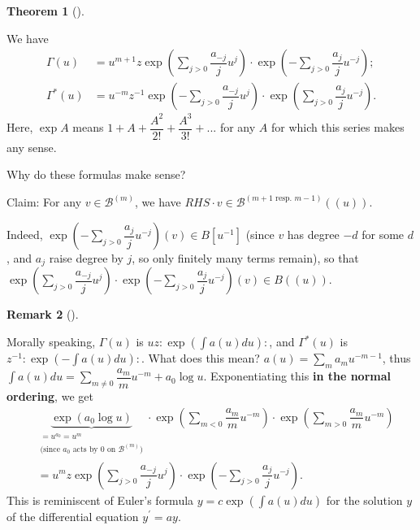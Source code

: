 \documentclass
[numbers=enddot,12pt,final,onecolumn,german,notitlepage]{scrartcl}%
\theoremstyle{definition}
\newtheorem{theo}{Theorem}
\newenvironment{theorem}[1][]
{\begin{theo}[#1]\begin{leftbar}}
{\end{leftbar}\end{theo}}
\newtheorem{remk}[theo]{Remark}
\newenvironment{remark}[1][]
{\begin{remk}[#1]\begin{leftbar}}
{\end{leftbar}\end{remk}}
\begin{document}
\begin{theorem}
\label{thm.euler}We have%
\begin{align*}
\Gamma\left(  u\right)   &  =u^{m+1}z\exp\left(  \sum\limits_{j>0}%
\dfrac{a_{-j}}{j}u^{j}\right)  \cdot\exp\left(  -\sum\limits_{j>0}\dfrac
{a_{j}}{j}u^{-j}\right)  ;\\
\Gamma^{\ast}\left(  u\right)   &  =u^{-m}z^{-1}\exp\left(  -\sum
\limits_{j>0}\dfrac{a_{-j}}{j}u^{j}\right)  \cdot\exp\left(  \sum
\limits_{j>0}\dfrac{a_{j}}{j}u^{-j}\right)  .
\end{align*}
Here, $\exp A$ means $1+A+\dfrac{A^{2}}{2!}+\dfrac{A^{3}}{3!}+...$ for any $A$
for which this series makes any sense.
\end{theorem}

Why do these formulas make sense?

Claim: For any $v\in\mathcal{B}^{\left(  m\right)  }$, we have $RHS\cdot
v\in\mathcal{B}^{\left(  m+1\text{ resp. }m-1\right)  }\left(  \left(
u\right)  \right)  $.

Indeed, $\exp\left(  -\sum\limits_{j>0}\dfrac{a_{j}}{j}u^{-j}\right)  \left(
v\right)  \in B\left[  u^{-1}\right]  $ (since $v$ has degree $-d$ for some
$d$, and $a_{j}$ raise degree by $j$, so only finitely many terms remain), so
that $\exp\left(  \sum\limits_{j>0}\dfrac{a_{-j}}{j}u^{j}\right)  \cdot
\exp\left(  -\sum\limits_{j>0}\dfrac{a_{j}}{j}u^{-j}\right)  \left(  v\right)
\in B\left(  \left(  u\right)  \right)  $.

\begin{remark}
Morally speaking, $\Gamma\left(  u\right)  $ is $uz:\exp\left(  \int a\left(
u\right)  du\right)  :$, and $\Gamma^{\ast}\left(  u\right)  $ is $z^{-1}%
:\exp\left(  -\int a\left(  u\right)  du\right)  :$. What does this mean?
$a\left(  u\right)  =\sum\limits_{m}a_{m}u^{-m-1}$, thus $\int a\left(
u\right)  du=\sum\limits_{m\neq0}\dfrac{a_{m}}{m}u^{-m}+a_{0}\log u$.
Exponentiating this \textbf{in the normal ordering}, we get%
\begin{align*}
&  \underbrace{\exp\left(  a_{0}\log u\right)  }_{\substack{=u^{a_{0}}%
=u^{m}\\\text{(since }a_{0}\text{ acts by }0\text{ on }\mathcal{B}^{\left(
m\right)  }\text{)}}}\cdot\exp\left(  \sum\limits_{m<0}\dfrac{a_{m}}{m}%
u^{-m}\right)  \cdot\exp\left(  \sum\limits_{m>0}\dfrac{a_{m}}{m}u^{-m}\right)
\\
&  =u^{m}z\exp\left(  \sum\limits_{j>0}\dfrac{a_{-j}}{j}u^{j}\right)
\cdot\exp\left(  -\sum\limits_{j>0}\dfrac{a_{j}}{j}u^{-j}\right)  .
\end{align*}
This is reminiscent of Euler's formula $y=c\exp\left(  \int a\left(  u\right)
du\right)  $ for the solution $y$ of the differential equation $y^{\prime}=ay$.
\end{remark}
\end{document}

